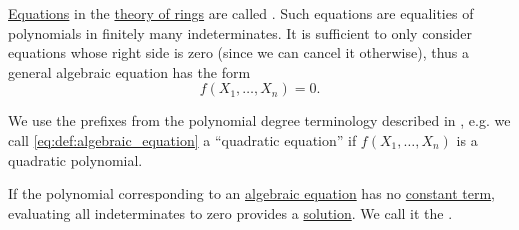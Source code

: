 \begin{definition}\label{def:algebraic_equation}\mimprovised
  \hyperref[def:equation]{Equations} in the \hyperref[def:ring/theory]{theory of rings} are called . Such equations are equalities of polynomials in finitely many indeterminates. It is sufficient to only consider equations whose right side is zero (since we can cancel it otherwise), thus a general algebraic equation has the form
  \begin{equation*}\label{eq:def:algebraic_equation}
    f(X_1, \ldots, X_n) = 0.
  \end{equation*}

  We use the prefixes from the polynomial degree terminology described in , e.g. we call \eqref{eq:def:algebraic_equation} a \enquote{quadratic equation} if \( f(X_1, \ldots, X_n) \) is a quadratic polynomial.
\end{definition}

\begin{definition}\label{def:trivial_solution_of_algebraic_equation}\mimprovised
  If the polynomial corresponding to an \hyperref[def:algebraic_equation]{algebraic equation} has no \hyperref[def:univariate_polynomial]{constant term}, evaluating all indeterminates to zero provides a \hyperref[def:equation/solution]{solution}. We call it the .
\end{definition}

